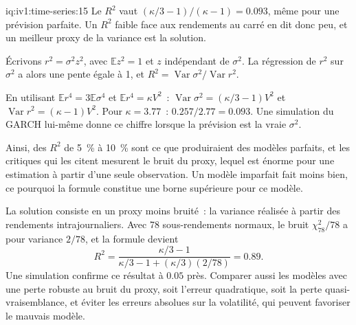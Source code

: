 \begin{solution}{iq:iv1:time-series:15}
Le $R^2$ vaut $(\kappa/3 - 1)/(\kappa - 1) = 0.093$, même pour une prévision parfaite. Un $R^2$ faible face aux rendements au carré en dit donc peu, et un meilleur proxy de la variance est la solution.

Écrivons $r^2 = \sigma^2z^2$, avec $\mathbb{E}z^2 = 1$ et $z$ indépendant de $\sigma^2$. La régression de $r^2$ sur $\sigma^2$ a alors une pente égale à 1, et $R^2 = \operatorname{Var}\sigma^2/\operatorname{Var}r^2$.

En utilisant $\mathbb{E}r^4 = 3\mathbb{E}\sigma^4$ et $\mathbb{E}r^4 = \kappa V^2$~: $\operatorname{Var}\sigma^2 = (\kappa/3 - 1)V^2$ et $\operatorname{Var}r^2 = (\kappa - 1)V^2$. Pour $\kappa = 3.77$~: $0.257/2.77 = 0.093$. Une simulation du GARCH lui-même donne ce chiffre lorsque la prévision est la vraie $\sigma^2$.

Ainsi, des $R^2$ de 5~\% à 10~\% sont ce que produiraient des modèles parfaits, et les critiques qui les citent mesurent le bruit du proxy, lequel est énorme pour une estimation à partir d'une seule observation. Un modèle imparfait fait moins bien, ce pourquoi la formule constitue une borne supérieure pour ce modèle.

La solution consiste en un proxy moins bruité~: la variance réalisée à partir des rendements intrajournaliers. Avec 78 sous-rendements normaux, le bruit $\chi^2_{78}/78$ a pour variance $2/78$, et la formule devient
\[
R^2 = \frac{\kappa/3 - 1}{\kappa/3 - 1 + (\kappa/3)(2/78)} = 0.89.
\]
Une simulation confirme ce résultat à $0.05$ près. Comparer aussi les modèles avec une perte robuste au bruit du proxy, soit l'erreur quadratique, soit la perte quasi-vraisemblance, et éviter les erreurs absolues sur la volatilité, qui peuvent favoriser le mauvais modèle.



\end{solution}

